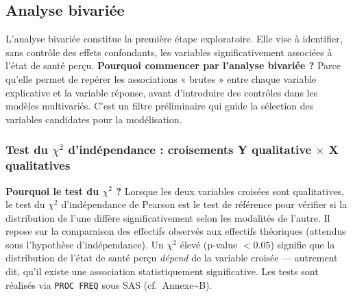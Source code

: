 \documentclass[11pt,a4paper]{memoirerecherche}
\begin{document}
\hypertarget{sec-bivariee}{%
\subsection{Analyse bivariée}\label{sec-bivariee}}

L'analyse bivariée constitue la première étape exploratoire. Elle vise à identifier, sans contrôle des effets confondants, les variables significativement associées à l'état de santé perçu. \textbf{Pourquoi commencer par l'analyse bivariée ?} Parce qu'elle permet de repérer les associations « brutes » entre chaque variable explicative et la variable réponse, avant d'introduire des contrôles dans les modèles multivariés. C'est un filtre préliminaire qui guide la sélection des variables candidates pour la modélisation.

\hypertarget{test-du-chi2-dinduxe9pendance-croisements-y-qualitative-times-x-qualitatives}{%
\subsubsection{\texorpdfstring{Test du \(\chi^2\) d'indépendance : croisements Y qualitative \(\times\) X qualitatives}{Test du \textbackslash chi\^{}2 d'indépendance : croisements Y qualitative \textbackslash times X qualitatives}}\label{test-du-chi2-dinduxe9pendance-croisements-y-qualitative-times-x-qualitatives}}

\textbf{Pourquoi le test du \(\chi^2\) ?} Lorsque les deux variables croisées sont qualitatives, le test du \(\chi^2\) d'indépendance de Pearson est le test de référence pour vérifier si la distribution de l'une diffère significativement selon les modalités de l'autre. Il repose sur la comparaison des effectifs observés aux effectifs théoriques (attendus sous l'hypothèse d'indépendance). Un \(\chi^2\) élevé (p-value \(< 0.05\)) signifie que la distribution de l'état de santé perçu \emph{dépend} de la variable croisée --- autrement dit, qu'il existe une association statistiquement significative. Les tests sont réalisés via \texttt{PROC\ FREQ} sous SAS (cf.~Annexe\textasciitilde B).
\end{document}
